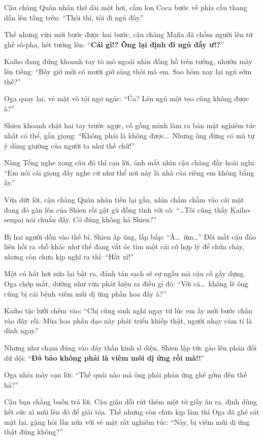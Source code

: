 \documentclass[../main.tex]{subfiles}
\begin{document}
Cậu chàng Quân nhân thở dài một hơi, cầm lon Coca bước về phía cầu thang dẫn lên tầng trên: ``Thôi thì, tôi đi ngủ đây.''

Thế nhưng vừa mới bước được hai bước, cậu chàng Mafia đã chồm người lên từ ghế sô-pha, hét tướng lên: ``\textbf{Cái gì!? Ông lại định đi ngủ đấy ư!?}''


Kaiho đang đứng khoanh tay tò mò ngoái nhìn đồng hồ trên tường, nhướn mày lên tiếng: ``Bây giờ mới có mười giờ sáng thôi mà em. Sao hôm nay lại ngủ sớm thế?''

Oga quay lại, vẻ mặt vô tội ngơ ngác: ``Ủa? Lên ngủ một tẹo cũng không được à?''

Shien khoanh chặt hai tay trước ngực, cố gồng mình làm ra bản mặt nghiêm túc nhất có thể, gằn giọng: ``Không phải là không được\dots\ Nhưng ông đừng có mà tự ý dùng giường của người ta như thế chứ!''

Nàng Tổng nghe xong câu đó thì cạn lời, ánh mắt nhìn cậu chàng đầy hoài nghi: ``Em nói cái giọng đấy nghe cứ như thể nơi này là nhà của riêng em không bằng ấy.''

Vừa dứt lời, cậu chàng Quân nhân tiến lại gần, nhìn chằm chằm vào cái mặt đang đỏ gân lên của Shien rồi gật gù đồng tình với cô: ``\dots Tôi cũng thấy Kaiho-senpai nói chuẩn đấy. Có đúng không hả Shien?''

Bị hai người dồn vào thế bí, Shien ấp úng, lắp bắp: ``À\dots\ ừm\dots'' Đôi mắt cậu đảo liên hồi ra chỗ khác như thể đang vắt óc tìm một cái cớ hợp lý để chữa cháy, nhưng còn chưa kịp nghĩ ra thì: ``Hắt xì!''

Một cú hắt hơi nữa lại bật ra, đánh tán sạch sẽ sự ngầu mà cậu cố gầy dựng. Oga chớp mắt, dường như vừa phát hiện ra điều gì đó: ``Với cả\dots\ không lẽ ông cũng bị cái bệnh viêm mũi dị ứng phấn hoa đấy à?''

Kaiho tặc lưỡi chêm vào: ``Chị cũng sinh nghi ngay từ lúc em ấy mới bước chân vào đây rồi. Mùa hoa phấn dạo này phát triển khiếp thật, người nhạy cảm tí là dính ngay.''

Nhưng như chạm đúng vào dây thần kinh sĩ diện, Shien lập tức gào lên phản đối dữ dội: ``\textbf{Đã bảo không phải là viêm mũi dị ứng rồi mà!!}''

Oga nhíu mày cạn lời: ``Thế quái nào mà ông phải phản ứng ghê gớm đến thế hả?''

Cậu bạn chẳng buồn trả lời. Cậu giận dỗi rút thêm một tờ giấy ăn ra, định dùng hết sức xì mũi lên đó để giải tỏa. Thế nhưng còn chưa kịp làm thì Oga đã ghé sát mặt lại, gặng hỏi lần nữa với vẻ mặt rất nghiêm túc: ``Này, bị viêm mũi dị ứng thật đúng không?''
\end{document}
